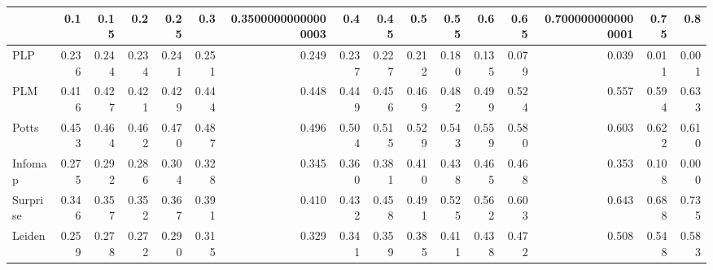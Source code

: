 \begin{tabular}{lrrrrrrrrrrrrrrr}
\toprule
{} &   0.1 &  0.15 &   0.2 &  0.25 &   0.3 & 0.35000000000000003 &   0.4 &  0.45 &   0.5 &  0.55 &   0.6 &  0.65 & 0.7000000000000001 &  0.75 &   0.8 \\
\midrule
PLP      & 0.236 & 0.244 & 0.234 & 0.241 & 0.251 &               0.249 & 0.237 & 0.227 & 0.212 & 0.180 & 0.135 & 0.079 &              0.039 & 0.011 & 0.001 \\
PLM      & 0.416 & 0.427 & 0.421 & 0.429 & 0.444 &               0.448 & 0.449 & 0.456 & 0.469 & 0.482 & 0.499 & 0.524 &              0.557 & 0.594 & 0.633 \\
Potts    & 0.453 & 0.464 & 0.462 & 0.470 & 0.487 &               0.496 & 0.504 & 0.515 & 0.529 & 0.543 & 0.559 & 0.580 &              0.603 & 0.622 & 0.610 \\
Infomap  & 0.275 & 0.292 & 0.286 & 0.304 & 0.328 &               0.345 & 0.360 & 0.381 & 0.410 & 0.438 & 0.465 & 0.468 &              0.353 & 0.108 & 0.000 \\
Surprise & 0.346 & 0.357 & 0.352 & 0.367 & 0.391 &               0.410 & 0.432 & 0.458 & 0.491 & 0.525 & 0.562 & 0.603 &              0.643 & 0.688 & 0.735 \\
Leiden   & 0.259 & 0.278 & 0.272 & 0.290 & 0.315 &               0.329 & 0.341 & 0.359 & 0.385 & 0.411 & 0.438 & 0.472 &              0.508 & 0.548 & 0.583 \\
\bottomrule
\end{tabular}
